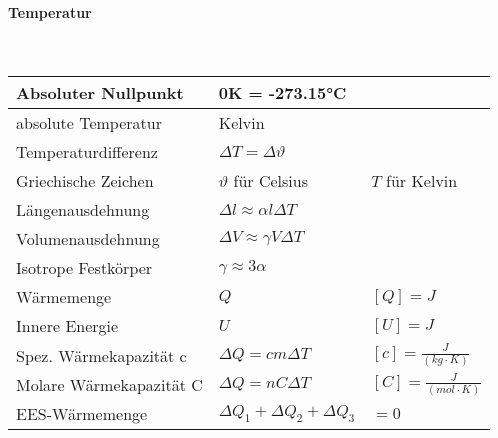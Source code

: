 \paragraph{Temperatur}\mbox{}\\
\noindent
\begin{tabularx}{\columnwidth}{@{}XXX@{}}
	Absoluter Nullpunkt                    & 0K = -273.15°C                                                                                              \\ \hline
	absolute Temperatur                    & Kelvin                                                                                                      \\ \hline
	Temperaturdifferenz                    & $\Delta T = \Delta \vartheta$                                                                               \\ \hline
	Griechische Zeichen                    & $\vartheta$ für Celsius                              & $T$ für Kelvin                                       \\ \hline
	Längenausdehnung                       & $\Delta l \approx \alpha l \Delta T$                                                                        \\ \hline
	Volumenausdehnung                      & $\Delta V \approx \gamma V \Delta T$                                                                        \\ \hline
	Isotrope Festkörper                    & $\gamma \approx 3\alpha$                                                                                    \\ \hline
	Wärmemenge                             & $Q$                                                  & $[Q] = J$                                            \\ \hline
	Innere Energie                         & $U$                                                  & $[U] = J$                                            \\ \hline
	Spez. Wärmekapazität c                 & $\Delta Q = cm\Delta T$                              & $[c] = \frac{J}{(kg\cdot K)}$                        \\ \hline
	Molare Wärmekapazität C                & $\Delta Q = nC\Delta T$                              & $[C] = \frac{J}{(mol\cdot K)}$                       \\ \hline
	EES-Wärmemenge                         & $\Delta Q_1 + \Delta Q_2 + \Delta Q_3$               & $= 0$                                                \\ \hline

\end{tabularx}
